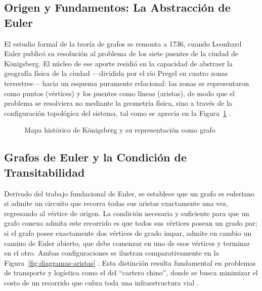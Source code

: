 \subsection{Origen y Fundamentos: La Abstracción de Euler}
\label{subsec:euler}
    El estudio formal de la teoría de grafos se remonta a 1736, cuando Leonhard Euler publicó su resolución al
    problema de los siete puentes de la ciudad de Königsberg. El núcleo de ese aporte residió en la capacidad de
    abstraer la geografía física de la ciudad ---dividida por el río Pregel en cuatro zonas terrestres--- hacia un
    esquema puramente relacional: las zonas se representaron como puntos (vértices) y los puentes como líneas
    (aristas), de modo que el problema se resolviera no mediante la geometría física, sino a través de la
    configuración topológica del sistema, tal como se aprecia en la Figura~\ref{fig:königsberg}
    \parencite{garcia2005, braicovich2009}.

\begin{figure}[H]
    \centering
    \caption{Mapa histórico de Königsberg y su representación como grafo}
    \label{fig:königsberg}
\end{figure}

\subsection{Grafos de Euler y la Condición de Transitabilidad}
\label{subsec:grafos-euler}
    Derivado del trabajo fundacional de Euler, se establece que un grafo es euleriano si admite un circuito que
    recorra todas sus aristas exactamente una vez, regresando al vértice de origen. La condición necesaria y
    suficiente para que un grafo conexo admita este recorrido es que todos sus vértices posean un grado par; si el
    grafo posee exactamente dos vértices de grado impar, admite en cambio un camino de Euler abierto, que debe
    comenzar en uno de esos vértices y terminar en el otro. Ambas configuraciones se ilustran comparativamente en
    la Figura~\ref{fig:diagramas-aristas} \parencite{garcia2005, braicovich2009}. Esta distinción resulta
    fundamental en problemas de transporte y logística como el del ``cartero chino'', donde se busca minimizar el
    costo de un recorrido que cubra toda una infraestructura vial \parencite{allauca2023}.

